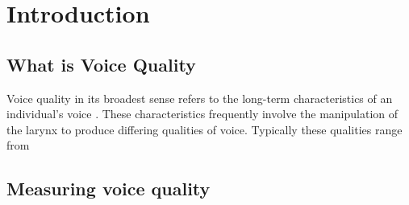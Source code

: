 \chapter{Introduction} \label{chap:introduction}


\section{What is Voice Quality} \label{sec:voice_quality}
Voice quality in its broadest sense refers to the long-term characteristics of an individual's voice \citep{abercrombieElementsGeneralPhonetics1967,laverPhoneticDescriptionVoice1980}. These characteristics frequently involve the manipulation of the larynx to produce differing qualities of voice. Typically these qualities range from

\section{Measuring voice quality} \label{sec:measuring_voice_quality}




